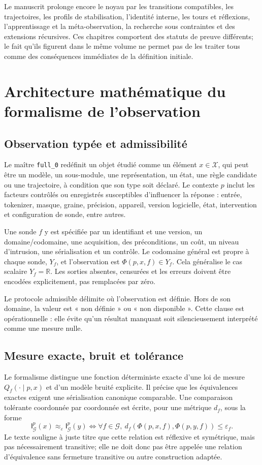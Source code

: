 \documentclass[11pt,a4paper,oneside]{report}
\newcommand{\R}{\mathbb R}
\newcommand{\X}{\mathcal X}
\newcommand{\Gcal}{\mathcal G}
\newcommand{\I}{\mathsf I}
\begin{document}
Le manuscrit prolonge encore le noyau par les transitions compatibles, les trajectoires, les profils de stabilisation, l'identité interne, les tours et réflexions, l'apprentissage et la méta-observation, la recherche sous contraintes et des extensions récursives. Ces chapitres comportent des statuts de preuve différents; le fait qu'ils figurent dans le même volume ne permet pas de les traiter tous comme des conséquences immédiates de la définition initiale.

\chapter{Architecture mathématique du formalisme de l'observation}
\section{Observation typée et admissibilité}
Le maître \texttt{full\_0} redéfinit un objet étudié comme un élément \(x\in\X\), qui peut être un modèle, un sous-module, une représentation, un état, une règle candidate ou une trajectoire, à condition que son type soit déclaré. Le contexte \(p\) inclut les facteurs contrôlés ou enregistrés susceptibles d'influencer la réponse : entrée, tokenizer, masque, graine, précision, appareil, version logicielle, état, intervention et configuration de sonde, entre autres.

Une sonde \(f\) y est spécifiée par un identifiant et une version, un domaine/codomaine, une acquisition, des préconditions, un coût, un niveau d'intrusion, une sérialisation et un contrôle. Le codomaine général est propre à chaque sonde, \(Y_f\), et l'observation est \(\Phi(p,x,f)\in Y_f\). Cela généralise le cas scalaire \(Y_f=\R\). Les sorties absentes, censurées et les erreurs doivent être encodées explicitement, pas remplacées par zéro.

Le protocole admissible délimite où l'observation est définie. Hors de son domaine, la valeur est « non définie » ou « non disponible ». Cette clause est opérationnelle : elle évite qu'un résultat manquant soit silencieusement interprété comme une mesure nulle.

\section{Mesure exacte, bruit et tolérance}
Le formalisme distingue une fonction déterministe exacte d'une loi de mesure \(Q_f(\cdot\mid p,x)\) et d'un modèle bruité explicite. Il précise que les équivalences exactes exigent une sérialisation canonique comparable. Une comparaison tolérante coordonnée par coordonnée est écrite, pour une métrique \(d_f\), sous la forme
\[
\I_\Gcal^p(x)\approx_\varepsilon\I_\Gcal^p(y)\iff
\forall f\in\Gcal,\ d_f(\Phi(p,x,f),\Phi(p,y,f))\leq\varepsilon_f.
\]
Le texte souligne à juste titre que cette relation est réflexive et symétrique, mais pas nécessairement transitive; elle ne doit donc pas être appelée une relation d'équivalence sans fermeture transitive ou autre construction adaptée.
\end{document}
